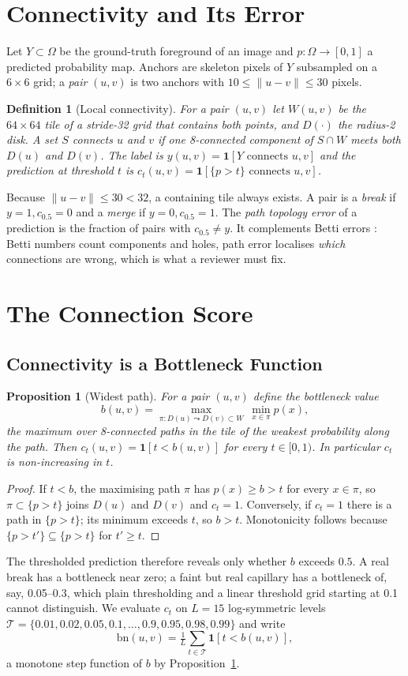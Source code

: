 \documentclass[10pt,letterpaper,journal]{IEEEtran}
\newtheorem{proposition}{Proposition}
\newtheorem{definition}{Definition}
\newcommand{\1}{\mathbf{1}}
\begin{document}
\section{Connectivity and Its Error}\label{sec:setup}
Let $Y\subset\Omega$ be the ground-truth foreground of an image and $p:\Omega\to[0,1]$ a predicted probability map. Anchors are skeleton pixels of $Y$ subsampled on a $6\times6$ grid; a \emph{pair} $(u,v)$ is two anchors with $10\le\|u-v\|\le30$ pixels.

\begin{definition}[Local connectivity]
For a pair $(u,v)$ let $W(u,v)$ be the $64\times64$ tile of a stride-32 grid that contains both points, and $D(\cdot)$ the radius-2 disk. A set $S$ \emph{connects} $u$ and $v$ if one 8-connected component of $S\cap W$ meets both $D(u)$ and $D(v)$. The label is $y(u,v)=\1[Y \text{ connects } u,v]$ and the prediction at threshold $t$ is $c_t(u,v)=\1[\{p>t\}\text{ connects }u,v]$.
\end{definition}
Because $\|u-v\|\le30<32$, a containing tile always exists. A pair is a \emph{break} if $y=1,c_{0.5}=0$ and a \emph{merge} if $y=0,c_{0.5}=1$. The \emph{path topology error} of a prediction is the fraction of pairs with $c_{0.5}\ne y$. It complements Betti errors \cite{hu2019}: Betti numbers count components and holes, path error localises \emph{which} connections are wrong, which is what a reviewer must fix.

\section{The Connection Score}\label{sec:score}
\subsection{Connectivity is a Bottleneck Function}
\begin{proposition}[Widest path]\label{prop:bottleneck}
For a pair $(u,v)$ define the bottleneck value
\[b(u,v)=\max_{\pi:D(u)\leadsto D(v)\subset W}\ \min_{x\in\pi}p(x),\]
the maximum over 8-connected paths in the tile of the weakest probability along the path. Then $c_t(u,v)=\1[t<b(u,v)]$ for every $t\in[0,1)$. In particular $c_t$ is non-increasing in $t$.
\end{proposition}
\begin{proof}
If $t<b$, the maximising path $\pi$ has $p(x)\ge b>t$ for every $x\in\pi$, so $\pi\subset\{p>t\}$ joins $D(u)$ and $D(v)$ and $c_t=1$. Conversely, if $c_t=1$ there is a path in $\{p>t\}$; its minimum exceeds $t$, so $b>t$. Monotonicity follows because $\{p>t'\}\subseteq\{p>t\}$ for $t'\ge t$.
\end{proof}
The thresholded prediction therefore reveals only whether $b$ exceeds $0.5$. A real break has a bottleneck near zero; a faint but real capillary has a bottleneck of, say, 0.05--0.3, which plain thresholding and a linear threshold grid starting at 0.1 cannot distinguish. We evaluate $c_t$ on $L=15$ log-symmetric levels $\mathcal T=\{0.01,0.02,0.05,0.1,\dots,0.9,0.95,0.98,0.99\}$ and write
\[\mathrm{bn}(u,v)=\tfrac1L\textstyle\sum_{t\in\mathcal T}\1[t<b(u,v)],\]
a monotone step function of $b$ by Proposition~\ref{prop:bottleneck}.
\end{document}
